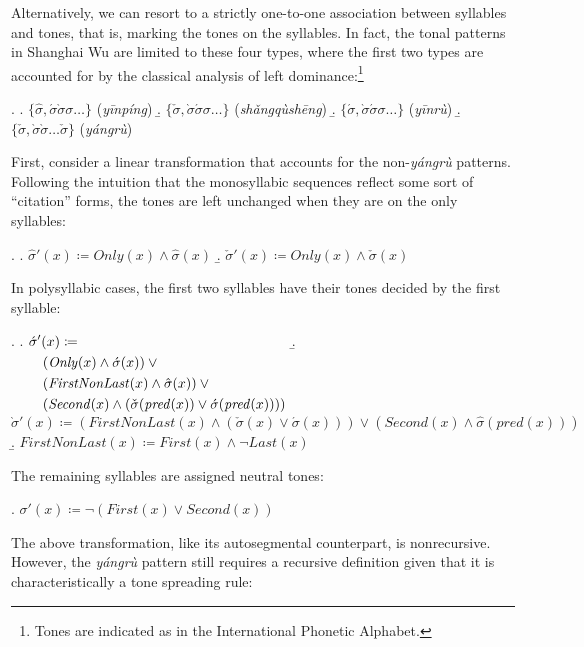 \documentclass[12pt, a4paper]{report}
\newcommand{\shift}{\hspace*{1em}}
\newcommand{\textform}[1]{\textit{#1}}
\begin{document}
Alternatively, we can resort to a strictly one-to-one association
between syllables and tones, that is, marking the tones on the
syllables.  In fact, the tonal patterns in Shanghai Wu are limited to
these four types, where the first two types are accounted for by the
classical analysis of left dominance:\footnote{Tones are indicated as
  in the International Phonetic Alphabet.}

\ex.
\a. \(\{\hat{\sigma}, \acute{\sigma}\grave{\sigma}\sigma\ldots\}\)
\hfill(\textform{yīnpíng})
\b. \(\{\check{\sigma},
\grave{\sigma}\acute{\sigma}\sigma\ldots\}\)
\hfill(\textform{shǎngqùshēng})
\b. \(\{\acute{\sigma},
\grave{\sigma}\acute{\sigma}\sigma\ldots\}\)
\hfill(\textform{yīnrù})
\b. \(\{\check{\sigma},
\grave{\sigma}\grave{\sigma}\ldots\check{\sigma}\}\)
\hfill(\textform{yángrù})

First, consider a linear transformation that accounts for the
non-\textform{yángrù} patterns.  Following the intuition that the
monosyllabic sequences reflect some sort of \enquote{citation} forms,
the tones are left unchanged when they are on the only syllables:

\ex.
\a. \(\hat{\sigma}'(x) \coloneq
\mathit{Only}(x) \land \hat{\sigma}(x)\)
\b. \(\check{\sigma}'(x) \coloneq
\mathit{Only}(x) \land \check{\sigma}(x)\)

In polysyllabic cases, the first two syllables have their tones
decided by the first syllable:

\ex.
\a. \(
\begin{aligned}[t]
  & \acute{\sigma}'(x) \coloneq \mbox{}\\
  &\shift (\mathit{Only}(x) \land \acute{\sigma}(x)) \lor \mbox{}\\
  &\shift (\mathit{FirstNonLast}(x) \land
    \hat{\sigma}(x)) \lor \mbox{}\\
  &\shift (\mathit{Second}(x) \land
    (\check{\sigma}(\mathit{pred}(x)) \lor
    \acute{\sigma}(\mathit{pred}(x))))
\end{aligned}\)
\b. \(\grave{\sigma}'(x) \coloneq
(\mathit{FirstNonLast}(x) \land
(\check{\sigma}(x) \lor \acute{\sigma}(x))) \lor
(\mathit{Second}(x) \land \hat{\sigma}(\mathit{pred}(x)))\)
\b. \(\mathit{FirstNonLast}(x) \coloneq
\mathit{First}(x) \land \neg\mathit{Last}(x)\)

The remaining syllables are assigned neutral tones:

\ex. \(\sigma'(x) \coloneq
\neg(\mathit{First}(x) \lor \mathit{Second}(x))\)


The above transformation, like its autosegmental counterpart, is
nonrecursive.  However, the \textform{yángrù} pattern still requires a
recursive definition given that it is characteristically a tone
spreading rule:
\end{document}
